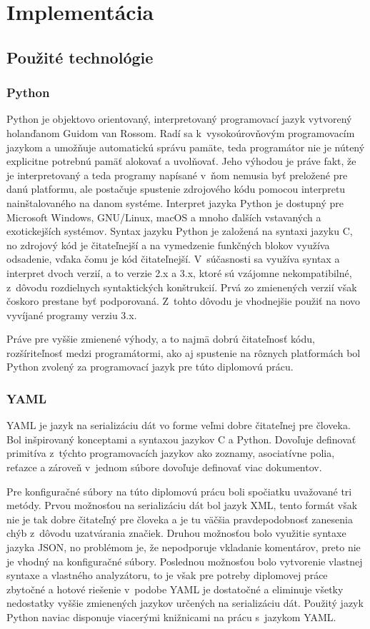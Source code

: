 \chapter{Implementácia}

\section{Použité technológie}
 \subsection{Python}
 Python \cite{B4mfUgNUpPnXbiEr} je objektovo orientovaný, interpretovaný programovací jazyk vytvorený holanďanom Guidom van Rossom. Radí sa k~vysokoúrovňovým programovacím jazykom a umožňuje automatickú správu pamäte, teda programátor nie je nútený explicitne potrebnú pamäť alokovať a uvolňovať. Jeho výhodou je práve fakt, že je interpretovaný a teda programy napísané v~ňom nemusia byť preložené pre danú platformu, ale postačuje spustenie zdrojového kódu pomocou interpretu nainštalovaného na danom systéme. Interpret jazyka Python je dostupný pre Microsoft Windows, GNU/Linux, macOS a mnoho ďalších vstavaných a exotickejších systémov. Syntax jazyku Python je založená na syntaxi jazyku C, no zdrojový kód je čitateľnejší a na vymedzenie funkčných blokov využíva odsadenie, vďaka čomu je kód čitateľnejší. V~súčasnosti sa využíva syntax a interpret dvoch verzií, a to verzie 2.x a 3.x, ktoré sú vzájomne nekompatibilné, z~dôvodu rozdielnych syntaktických konštrukcií. Prvá zo zmienených verzií však čoskoro prestane byť podporovaná. Z~tohto dôvodu je vhodnejšie použiť na novo vyvíjané programy verziu 3.x. 
  
 Práve pre vyššie zmienené výhody, a to najmä dobrú čitateľnosť kódu, rozšíriteľnosť  medzi programátormi, ako aj spustenie na rôznych platformách bol Python zvolený za programovací jazyk pre túto diplomovú prácu.
 \subsection{YAML}
 YAML \cite{Jd4UTaVyTULvXDoN} je jazyk na serializáciu dát vo forme veľmi dobre čitateľnej pre človeka. Bol inšpirovaný konceptami a syntaxou jazykov C a Python. Dovoľuje definovať primitíva z~týchto programovacích jazykov ako zoznamy, asociatívne polia, reťazce a zároveň v~jednom súbore dovoľuje definovať viac dokumentov.
 
 Pre konfiguračné súbory na túto diplomovú prácu boli spočiatku uvažované tri metódy. Prvou možnosťou na serializáciu dát bol jazyk XML, tento formát však nie je tak dobre čitateľný pre človeka a je tu väčšia pravdepodobnosť zanesenia chýb z~dôvodu uzatvárania značiek. Druhou možnosťou bolo využitie syntaxe jazyka JSON, no problémom je, že nepodporuje vkladanie komentárov, preto nie je vhodný na konfiguračné súbory. Poslednou možnosťou bolo vytvorenie vlastnej syntaxe a vlastného analyzátoru, to je však pre potreby diplomovej práce zbytočné a hotové riešenie v~podobe YAML je dostatočné a eliminuje všetky nedostatky vyššie zmienených jazykov určených na serializáciu dát. Použitý jazyk Python naviac disponuje viacerými knižnicami na prácu s~jazykom YAML.  
